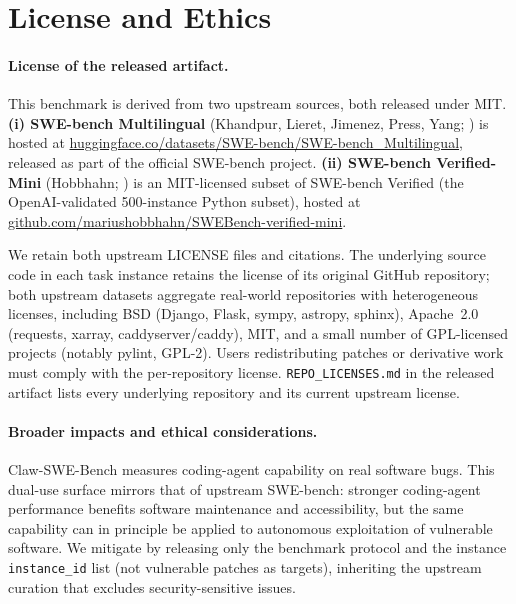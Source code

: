 \section{ License and Ethics}\label{appendix:license}

\paragraph{License of the released artifact.}
This benchmark is derived from two upstream sources, both released under MIT.
\textbf{(i) SWE-bench Multilingual} (Khandpur, Lieret, Jimenez, Press, Yang;
\cite{swe_smith}) is hosted at
\url{huggingface.co/datasets/SWE-bench/SWE-bench_Multilingual}, released as
part of the official SWE-bench project.
\textbf{(ii) SWE-bench Verified-Mini} (Hobbhahn; \cite{swebench_verified_mini})
is an MIT-licensed subset of SWE-bench Verified (the OpenAI-validated
500-instance Python subset), hosted at
\url{github.com/mariushobbhahn/SWEBench-verified-mini}.

We retain both upstream LICENSE files and citations. The underlying source
code in each task instance retains the license of its original GitHub
repository; both upstream datasets aggregate real-world repositories with
heterogeneous licenses, including BSD (Django, Flask, sympy, astropy,
sphinx), Apache~2.0 (requests, xarray, caddyserver/caddy), MIT, and a
small number of GPL-licensed projects (notably pylint, GPL-2). Users
redistributing patches or derivative work must comply with the
per-repository license. \texttt{REPO\_LICENSES.md} in the released artifact
lists every underlying repository and its current upstream license.


\paragraph{Broader impacts and ethical considerations.}
Claw-SWE-Bench measures coding-agent capability on real software bugs.
This dual-use surface mirrors that of upstream SWE-bench: stronger
coding-agent performance benefits software maintenance and accessibility,
but the same capability can in principle be applied to autonomous
exploitation of vulnerable software. We mitigate by releasing only the
benchmark protocol and the instance \texttt{instance\_id} list (not
vulnerable patches as targets), inheriting the upstream curation that
excludes security-sensitive issues.


